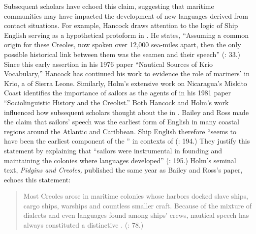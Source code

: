 Subsequent scholars have echoed this claim, suggesting that maritime communities may have impacted the development of new languages derived from contact situations. For example, Hancock draws attention to the logic of Ship English serving as a hypothetical protoform in . He states, “Assuming a common origin for these Creoles, now spoken over 12,000 sea-miles apart, then the only possible historical link between them was the seamen and their speech” (\citealt{Hancock1976}: 33.) Since this early assertion in his 1976 paper “Nautical Sources of Krio Vocabulary,” Hancock has continued his work to evidence the role of mariners’  in Krio, a  of Sierra Leone. Similarly, Holm’s extensive work on Nicaragua’s Miskito Coast  identifies the importance of sailors as the agents of  in his 1981 paper “Sociolinguistic History and the Creolist.” Both Hancock and Holm’s work influenced how subsequent scholars thought about the  in . \citealt{In1988} Bailey and Ross made the claim that sailors’ speech was the earliest form of English  in many coastal regions around the Atlantic and Caribbean. Ship English therefore “seems to have been the earliest component of the ” in contexts of  (\citealt{BaileyRoss1988}: 194.) They justify this statement by explaining that “sailors were instrumental in founding and maintaining the colonies where  languages developed” (\citealt{BaileyRoss1988}: 195.) Holm’s seminal text, \textit{Pidgins and Creoles,} published the same year as Bailey and Ross’s paper, echoes this statement: 

\begin{quotation}
Most Creoles arose in maritime colonies whose harbors docked slave ships, cargo ships, warships and countless smaller craft. Because of the mixture of dialects and even languages found among ships' crews, nautical speech has always constituted a distinctive . (\citealt{Holm1988}: 78.) \end{quotation}

